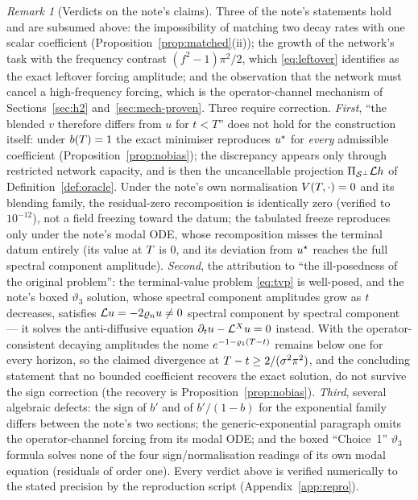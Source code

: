 \documentclass[11pt]{article}
\newcommand{\modeDecayRate}[1]{\varrho_{#1}} %
\theoremstyle{plain}
\theoremstyle{definition}
\theoremstyle{remark}
\newtheorem{remark}[theorem]{Remark}
\begin{document}
\begin{remark}[Verdicts on the note's claims]\label{rem:note}
Three of the note's statements hold and are subsumed above: the impossibility of
matching two decay rates with one scalar coefficient
(Proposition~\ref{prop:matched}(ii)); the growth of the network's task with the
frequency contrast $(f^{2}-1)\pi^{2}/2$, which \eqref{eq:leftover} identifies as
the exact leftover forcing amplitude; and the observation that the network must
cancel a high-frequency forcing, which is the operator-channel mechanism of
Sections~\ref{sec:h2} and~\ref{sec:mech-proven}. Three require correction.
\emph{First}, ``the blended $v$ therefore differs from $u$ for $t<T$'' does not
hold for the construction itself: under
$b(T)=1$ the exact minimiser reproduces
$u^{\star}$ for \emph{every} admissible coefficient
(Proposition~\ref{prop:nobias}); the discrepancy appears only through restricted
network capacity, and is then the uncancellable projection
$\Pi_{\mathcal{S}^{\perp}}\mathcal{L}h$ of
Definition~\ref{def:oracle}. Under the note's own normalisation $V(T,\cdot)=0$
and its blending family, the residual-zero recomposition is identically zero
(verified to $10^{-12}$), not a field freezing toward the datum; the tabulated
freeze reproduces only under the note's modal ODE, whose recomposition misses the
terminal datum entirely (its value at $T$ is $0$, and its deviation
from $u^{\star}$ reaches the full spectral component amplitude). \emph{Second},
the attribution to ``the ill-posedness of the original problem'': the
terminal-value problem \eqref{eq:tvp} is well-posed, and the note's boxed
$\vartheta_3$ solution, whose spectral component amplitudes grow as $t$ decreases,
satisfies $\pdeOperator\solutionField=-2\modeDecayRate{n}\solutionField\neq0$
spectral component by spectral component --- it solves the anti-diffusive equation
$\partial_{t}u-\mathcal{L}^{X}u=0$
instead. With the operator-consistent decaying amplitudes the nome
$e^{-1-\modeDecayRate{1}(\timeHorizon-\timePoint)}$ remains below one for every
horizon, so the claimed divergence at
$T-t\ge2/(\sigma^{2}\pi^{2})$, and the concluding statement
that no bounded coefficient recovers the exact solution, do not survive the sign
correction (the recovery is Proposition~\ref{prop:nobias}). \emph{Third},
several algebraic defects: the sign of $b'$ and of $b'/(1-b)$ for the
exponential family differs between the note's two sections; the
generic-exponential paragraph omits the operator-channel forcing from its modal
ODE; and the boxed ``Choice~1'' $\vartheta_3$ formula solves none of the four
sign/normalisation readings of its own modal equation (residuals of order one).
Every verdict above is verified numerically to the stated precision by the
reproduction script (Appendix~\ref{app:repro}).
\end{remark}
\end{document}
